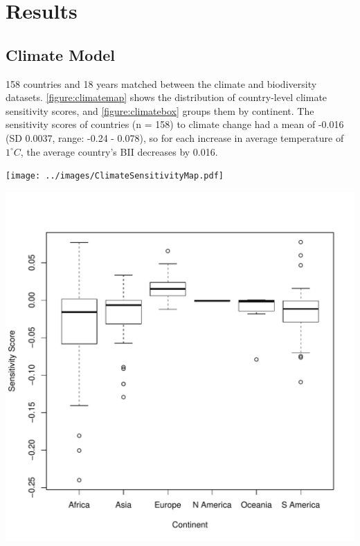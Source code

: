 \documentclass[11pt, a4paper, titlepage]{article}
\begin{document}
	
	\clearpage

	\section*{Results}
	\subsection*{Climate Model}
	
	158 countries and 18 years matched between the climate and biodiversity datasets. \autoref{figure:climatemap} shows the distribution of country-level climate sensitivity scores, and \autoref{figure:climatebox} groups them by continent. The sensitivity scores of countries (n = 158) to climate change had a mean of -0.016 (SD 0.0037, range: -0.24 - 0.078), so for each increase in average temperature of $1^\circ C$, the average country's BII decreases by 0.016.

	\texttt{[image: ../images/ClimateSensitivityMap.pdf]}
	\label{figure:climatemap}

	\includegraphics[scale=0.95]{../images/ClimateSensitivityBoxplot.pdf}
	\label{figure:climatebox}
	\bigskip
	
\end{document}
